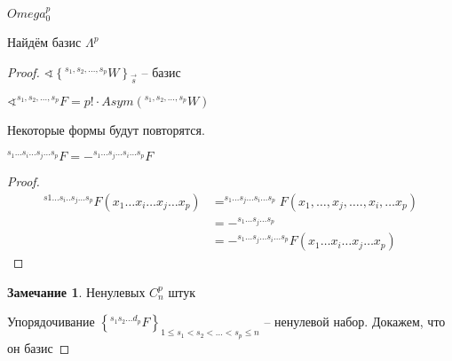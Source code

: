 \documentclass{book}
\theoremstyle{definition}
\newtheorem*{note}{Замечание}
\begin{document}
 \begin{problem}
        $Omega_0^p$

     Найдём базис $\Lambda ^p$
 \end{problem}
 \begin{proof}
     $\sphericalangle \left\{ ^{s_1, s_2, \ldots, s_p} W \right\} _{\vec s}$ -- базис

     $\sphericalangle ^{s_1, s_2, \ldots, s_p}F = p!\cdot Asym \left( ^{s_1, s_2, \ldots, s_p}W \right) $

     \begin{lemma}
         Некоторые формы будут повторятся.

         $^{s_1 \ldots s_i \ldots s_j \ldots s_p}F = - ^{s_1 \ldots s_j \ldots s_i \ldots s_p} F$
     \end{lemma}

     \begin{proof}
        \begin{align*}
            ^{s1 ... s_i .. s_j \ldots s_p}F\left( x_1 \ldots x_i \ldots x_j \ldots x_p \right)  &= ^{s_1 \ldots s_j \ldots s_i \ldots s_p}F\left( x_1, \ldots, x_j, \ldots., x_i, \ldots x_p \right)\\
            &  = - ^{s_1 \ldots s_j \ldots s_p}\\
            &= - ^{s_1 \ldots s_j \ldots s_i \ldots s_p}F\left( x_1 \ldots x_i \ldots x_j \ldots x_p \right) 
        \end{align*}     
     \end{proof}

     \begin{note}
         Ненулевых $C_n^p$ штук
     \end{note}
     
     Упорядочивание $\left\{ ^{s_1 s_2 \ldots d_p} F\right\}_{1 \leqslant s_1 < s_2 < \ldots < s_p \leqslant n} $  -- ненулевой набор. Докажем, что он базис


 \end{proof}
\end{document}
